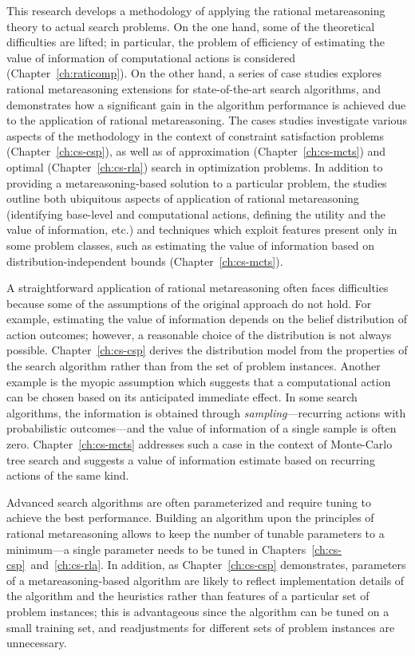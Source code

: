 This research develops a methodology of applying the rational
metareasoning theory to actual search problems.  On the one hand, some
of the theoretical difficulties are lifted; in particular, the problem
of efficiency of estimating the value of information of computational
actions is considered (Chapter~\ref{ch:raticomp}). On the other hand,
a series of case studies explores rational metareasoning extensions
for state-of-the-art search algorithms, and demonstrates how a
significant gain in the algorithm performance is achieved due to the
application of rational metareasoning. The cases studies investigate
various aspects of the methodology in the context of constraint satisfaction
problems (Chapter~\ref{ch:cs-csp}), as well as of approximation
(Chapter~\ref{ch:cs-mcts}) and optimal (Chapter~\ref{ch:cs-rla})
search in optimization problems. In addition to providing a
metareasoning-based solution to a particular problem, the studies
outline both ubiquitous aspects of application of rational metareasoning
(identifying base-level and computational actions, defining the
utility and the value of information, etc.)  and techniques which
exploit features present only in some problem classes, such as
estimating the value of information based on distribution-independent
bounds (Chapter~\ref{ch:cs-mcts}).

A straightforward application of rational metareasoning often faces
difficulties because some of the assumptions of the original approach do not
hold. For example, estimating the value of information depends on
the belief distribution of action outcomes; however, a reasonable choice
of the distribution is not always possible. Chapter~\ref{ch:cs-csp}
derives the distribution model from the properties of the search
algorithm rather than from the set of problem instances. Another
example is the myopic assumption \cite{Russell.right} which suggests
that a computational action can be chosen based on its anticipated immediate
effect. In some search algorithms, the information is obtained through
\emph{sampling}---recurring actions with probabilistic outcomes---and
the value of information of a single sample is often
zero. Chapter~\ref{ch:cs-mcts} addresses such a case in the context
of Monte-Carlo tree search and suggests a value of information
estimate based on recurring actions of the same kind.

Advanced search algorithms are often parameterized and require tuning
to achieve the best performance. Building an algorithm upon the
principles of rational metareasoning allows to keep the number of
tunable parameters to a minimum---a single parameter needs to be tuned
in Chapters~\ref{ch:cs-csp}~and~\ref{ch:cs-rla}. In addition, as
Chapter~\ref{ch:cs-csp} demonstrates, parameters
of a metareasoning-based algorithm are likely to reflect
implementation details of the algorithm and the heuristics rather
than features of a particular set of problem instances; this is
advantageous since the algorithm can be tuned on a small training set,
and readjustments for different sets of problem instances are
unnecessary. 


